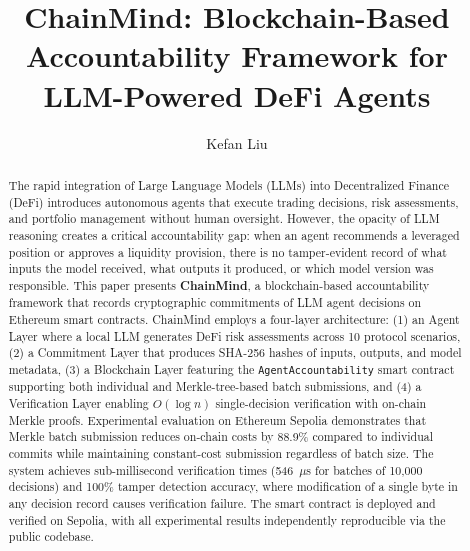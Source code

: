 \documentclass[manuscript,nonacm]{acmart}
\begin{document}
\title{ChainMind: Blockchain-Based Accountability Framework for LLM-Powered DeFi Agents}

\author{Kefan Liu}

\begin{abstract}
The rapid integration of Large Language Models (LLMs) into Decentralized Finance (DeFi) introduces autonomous agents that execute trading decisions, risk assessments, and portfolio management without human oversight. However, the opacity of LLM reasoning creates a critical accountability gap: when an agent recommends a leveraged position or approves a liquidity provision, there is no tamper-evident record of what inputs the model received, what outputs it produced, or which model version was responsible. This paper presents \textbf{ChainMind}, a blockchain-based accountability framework that records cryptographic commitments of LLM agent decisions on Ethereum smart contracts. ChainMind employs a four-layer architecture: (1) an Agent Layer where a local LLM generates DeFi risk assessments across 10 protocol scenarios, (2) a Commitment Layer that produces SHA-256 hashes of inputs, outputs, and model metadata, (3) a Blockchain Layer featuring the \texttt{AgentAccountability} smart contract supporting both individual and Merkle-tree-based batch submissions, and (4) a Verification Layer enabling $O(\log n)$ single-decision verification with on-chain Merkle proofs. Experimental evaluation on Ethereum Sepolia demonstrates that Merkle batch submission reduces on-chain costs by 88.9\% compared to individual commits while maintaining constant-cost submission regardless of batch size. The system achieves sub-millisecond verification times (546~$\mu$s for batches of 10,000 decisions) and 100\% tamper detection accuracy, where modification of a single byte in any decision record causes verification failure. The smart contract is deployed and verified on Sepolia, with all experimental results independently reproducible via the public codebase.
\end{abstract}


\maketitle
\end{document}
